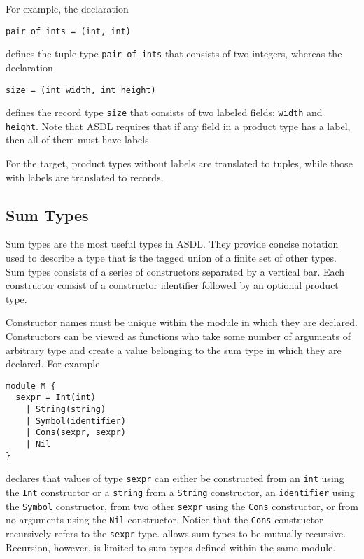For example, the declaration
\begin{code}\begin{lstlisting}[language=ASDL]
pair_of_ints = (int, int)
\end{lstlisting}\end{code}%
defines the tuple type \lstinline[language=ASDL]!pair_of_ints! that consists of two integers,
whereas the declaration
\begin{code}\begin{lstlisting}[language=ASDL]
size = (int width, int height)
\end{lstlisting}\end{code}%
defines the record type \lstinline[language=ASDL]!size! that consists of two
labeled fields: \lstinline[language=ASDL]@width@ and \lstinline[language=ASDL]@height@.
Note that ASDL requires that if any field in a product type has a label, then all
of them must have labels.

For the \sml{} target, product types without labels are translated to tuples, while
those with labels are translated to records.

\subsection{Sum Types}

Sum types are the most useful types in ASDL. They provide concise notation
used to describe a type that is the tagged union of a finite set of other
types.  Sum types consists of a series of constructors separated by a
vertical bar. Each constructor consist of a constructor identifier followed
by an optional product type.

Constructor names must be unique within the module in which they are
declared. Constructors can be viewed as functions who take some number of
arguments of arbitrary type and create a value belonging to the sum type in
which they are declared.
For example
\begin{code}\begin{lstlisting}[language=ASDL]
module M {
  sexpr = Int(int)
	| String(string)
	| Symbol(identifier)
	| Cons(sexpr, sexpr)
	| Nil
}
\end{lstlisting}\end{code}%
declares that values of type \lstinline[language=ASDL]!sexpr! can either be
constructed from an \lstinline[language=ASDL]!int! using the
\lstinline[language=ASDL]!Int! constructor or a \lstinline[language=ASDL]!string!
from a \lstinline[language=ASDL]!String! constructor, an
\lstinline[language=ASDL]!identifier! using the \lstinline[language=ASDL]!Symbol!
constructor, from two other \lstinline[language=ASDL]!sexpr! using the
\lstinline[language=ASDL]!Cons! constructor, or from no arguments
using the \lstinline[language=ASDL]!Nil! constructor.
Notice that the \lstinline[language=ASDL]!Cons! constructor
recursively refers to the \lstinline[language=ASDL]!sexpr! type.
\asdl{} allows sum types to be mutually recursive.
Recursion, however, is limited to sum types defined within the same module.

